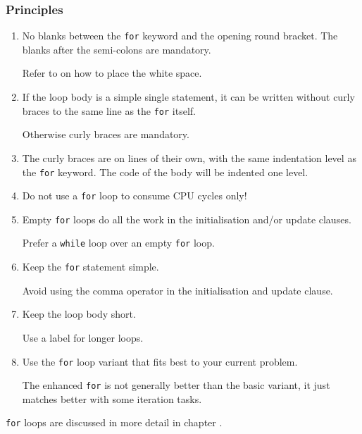 \subsubsection{Principles}
\begin{enumerate}[label=P\arabic*.]
\item{No blanks between the \lstinline|for| keyword and the opening round bracket. The blanks after the semi-colons are mandatory.

Refer to  on how to place the white space.}
\item{If the loop body is a simple single statement, it can be written without curly braces to the same line as the \lstinline|for| itself.

Otherwise curly braces are mandatory.}
\item{The curly braces are on lines of their own, with the same indentation level as the \lstinline|for| keyword. The code of the body will be indented one level.}
\item{Do not use a \lstinline|for| loop to consume CPU cycles only!}
\item{Empty \lstinline|for| loops do all the work in the initialisation and/or update clauses.

Prefer a \lstinline|while| loop over an empty \lstinline|for| loop.}
\item{Keep the \lstinline|for| statement simple.

Avoid using the comma operator in the initialisation and update clause.}
\item{Keep the loop body short.

Use a label for longer loops.}
\item{Use the \lstinline|for| loop variant that fits best to your current problem.

The enhanced \lstinline|for| is not generally better than the basic variant, it just matches better with some iteration tasks.}
\end{enumerate}

\lstinline|for| loops are discussed in more detail in chapter .

